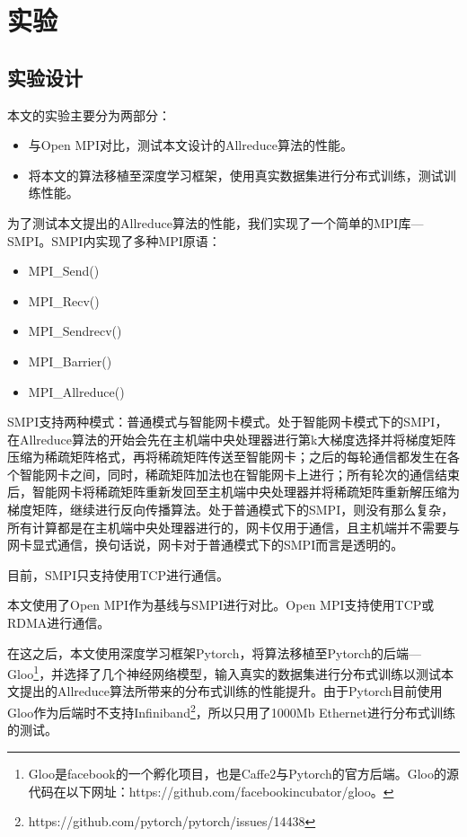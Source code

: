 \chapter{实验}
\label{chap4}

\section{实验设计}
本文的实验主要分为两部分：
\begin{itemize}
    \item 与Open MPI对比，测试本文设计的Allreduce算法的性能。
    \item 将本文的算法移植至深度学习框架，使用真实数据集进行分布式训练，测试训练性能。
\end{itemize}

为了测试本文提出的Allreduce算法的性能，我们实现了一个简单的MPI库---SMPI。SMPI内实现了多种MPI原语：
\begin{itemize}
    \item MPI\_Send()
    \item MPI\_Recv()
    \item MPI\_Sendrecv()
    \item MPI\_Barrier()
    \item MPI\_Allreduce()
\end{itemize}

SMPI支持两种模式：普通模式与智能网卡模式。处于智能网卡模式下的SMPI，在Allreduce算法的开始会先在主机端中央处理器进行第k大梯度选择并将梯度矩阵压缩为稀疏矩阵格式，再将稀疏矩阵传送至智能网卡；之后的每轮通信都发生在各个智能网卡之间，同时，稀疏矩阵加法也在智能网卡上进行；所有轮次的通信结束后，智能网卡将稀疏矩阵重新发回至主机端中央处理器并将稀疏矩阵重新解压缩为梯度矩阵，继续进行反向传播算法。处于普通模式下的SMPI，则没有那么复杂，所有计算都是在主机端中央处理器进行的，网卡仅用于通信，且主机端并不需要与网卡显式通信，换句话说，网卡对于普通模式下的SMPI而言是透明的。

目前，SMPI只支持使用TCP进行通信。

本文使用了Open MPI作为基线与SMPI进行对比。Open MPI支持使用TCP或RDMA进行通信。

在这之后，本文使用深度学习框架Pytorch，将算法移植至Pytorch的后端---Gloo\footnote{Gloo是facebook的一个孵化项目，也是Caffe2与Pytorch的官方后端。Gloo的源代码在以下网址：https://github.com/facebookincubator/gloo。}，并选择了几个神经网络模型，输入真实的数据集进行分布式训练以测试本文提出的Allreduce算法所带来的分布式训练的性能提升。由于Pytorch目前使用Gloo作为后端时不支持Infiniband\footnote{https://github.com/pytorch/pytorch/issues/14438}，所以只用了1000Mb Ethernet进行分布式训练的测试。


